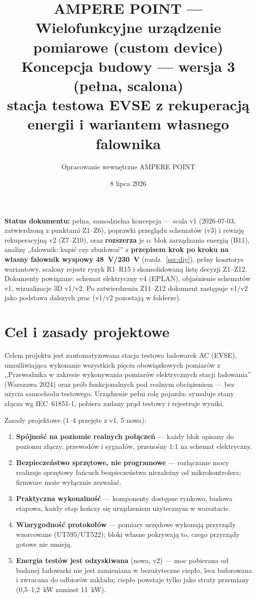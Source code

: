 \documentclass[11pt,a4paper]{article}
\title{\textbf{AMPERE POINT --- Wielofunkcyjne urządzenie pomiarowe (custom device)}\\[4pt]
\large Koncepcja budowy --- wersja 3 (pełna, scalona)\\
stacja testowa EVSE z rekuperacją energii i wariantem własnego falownika}
\author{Opracowanie wewnętrzne AMPERE POINT}
\date{8 lipca 2026}
\begin{document}
\maketitle
\vspace{-1.5em}

\noindent\textbf{Status dokumentu:} pełna, samodzielna koncepcja --- scala v1 (2026-07-03, zatwierdzoną
z punktami Z1--Z6), poprawki przeglądu schematów (v3) i rewizję rekuperacyjną v2 (Z7--Z10), oraz
\textbf{rozszerza} je o: blok zarządzania energią (B11), analizę ,,falownik: kupić czy zbudować''
z \textbf{przepisem krok po kroku na własny falownik wyspowy 48~V/230~V} (rozdz.~\ref{sec:diy}),
pełny kosztorys wariantowy, scalony rejestr ryzyk R1--R15 i skonsolidowaną listę decyzji Z1--Z12.
Dokumenty powiązane: schemat elektryczny v4 (EPLAN), objaśnienie schematów v1, wizualizacje 3D v1/v2.
Po zatwierdzeniu Z11--Z12 dokument zastępuje v1/v2 jako podstawa dalszych prac (v1/v2 pozostają w folderze).

\tableofcontents

\section{Cel i zasady projektowe}
Celem projektu jest zautomatyzowana stacja testowa ładowarek AC (EVSE), umożliwiająca wykonanie
wszystkich pięciu obowiązkowych pomiarów z ,,Przewodnika w zakresie wykonywania pomiarów elektrycznych
stacji ładowania'' (Warszawa 2024) oraz prób funkcjonalnych pod realnym obciążeniem --- bez użycia
samochodu testowego. Urządzenie pełni rolę pojazdu: symuluje stany złącza wg IEC~61851-1, pobiera
zadany prąd testowy i rejestruje wyniki.

Zasady projektowe (1--4 przejęte z v1, 5 nowa):
\begin{enumerate}
\item \textbf{Spójność na poziomie realnych połączeń} --- każdy blok opisany do poziomu złączy,
przewodów i sygnałów, przenośny 1:1 na schemat elektryczny.
\item \textbf{Bezpieczeństwo sprzętowe, nie programowe} --- rozłączanie mocy realizuje sprzętowy
łańcuch bezpieczeństwa niezależny od mikrokontrolera; firmware może wyłącznie zezwalać.
\item \textbf{Praktyczna wykonalność} --- komponenty dostępne rynkowo, budowa etapowa, każdy etap
kończy się urządzeniem użytecznym w warsztacie.
\item \textbf{Wiarygodność protokołów} --- pomiary urzędowe wykonują przyrządy wzorcowane
(UT595/UT522); bloki własne pokrywają to, czego przyrządy gotowe nie umieją.
\item \textbf{Energia testów jest odzyskiwana} (nowa, v2) --- moc pobierana od badanej ładowarki
nie jest zamieniana w bezużyteczne ciepło, lecz buforowana i zwracana do odbiorów zakładu;
ciepło powstaje tylko jako straty przemiany (0,5--1,2~kW zamiast 11~kW).
\end{enumerate}
\end{document}
